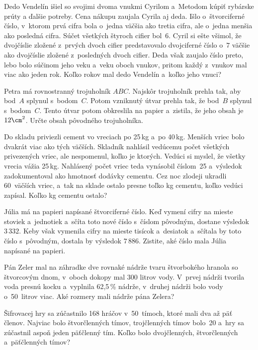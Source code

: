 {%
Dedo Vendelín išiel so svojimi dvoma vnukmi Cyrilom a~Metodom kúpiť rybárske prúty a ďalšie potreby. Cena nákupu zaujala Cyrila aj deda.
Išlo o~štvorciferné číslo, v~ktorom prvá cifra bola o~jedna väčšia ako tretia cifra, ale o~jedna menšia ako posledná cifra.
Súčet všetkých štyroch cifier bol~$6$.
Cyril si ešte všimol, že dvojčíslie zložené z~prvých dvoch cifier predstavovalo dvojciferné číslo o~$7$ väčšie ako dvojčíslie zložené z~posledných dvoch cifier.
Deda však zaujalo číslo preto, lebo bolo súčinom jeho veku a~veku oboch vnukov,
pritom každý z~vnukov mal viac ako jeden rok. Koľko rokov mal dedo Vendelín a~koľko jeho vnuci?
}

{%
Petra má rovnostranný trojuholník $ABC$. Najskôr trojuholník prehla tak, aby bod~$A$ splynul s~bodom~$C$.
Potom vzniknutý útvar prehla tak, že bod~$B$ splynul s~bodom~$C$.
Tento útvar potom obkreslila na papier a~zistila, že jeho obsah je $12\cm^2$. Určte obsah pôvodného trojuholníka.
}

{%
Do skladu priviezli cement vo vreciach po 25\,kg a~po 40\,kg. Menších vriec bolo dvakrát viac ako tých väčších.
Skladník nahlásil vedúcemu počet všetkých privezených vriec, ale nespomenul, koľko je ktorých.
Vedúci si myslel, že všetky vrecia vážia 25\,kg. Nahlásený počet vriec teda vynásobil číslom~25 a~výsledok zadokumentoval
ako hmotnosť dodávky cementu. Cez noc zlodeji ukradli 60~väčších vriec, a~tak na sklade ostalo presne
toľko kg cementu, koľko vedúci zapísal. Koľko kg cementu ostalo?
}

{%
Júlia má na papieri napísané štvorciferné číslo.
Keď vymení cifry na mieste stoviek a~jednotiek a~sčíta toto
nové číslo s~číslom pôvodným, dostane výsledok $3\,332$.
Keby však vymenila cifry na mieste tisícok a~desiatok a~sčítala by toto číslo
s~pôvodným, dostala by výsledok $7\,886$.
Zistite, aké číslo mala Júlia napísané na papieri.
}

{%
Pán Zeler mal na záhradke dve rovnaké nádrže tvaru štvorbokého hranola
so štvorcovým dnom, v~oboch dokopy mal 300 litrov vody.
V~prvej nádrži tvorila voda presnú kocku a~vyplnila 62{,}5\,\% nádrže, v~druhej
nádrži bolo vody o~50~litrov viac. Aké rozmery mali nádrže pána Zelera?
}

{%
Šifrovacej hry sa zúčastnilo 168 hráčov v~50~tímoch, ktoré mali dva až päť členov.
Najviac bolo štvorčlenných tímov, trojčlenných tímov bolo~20 a~hry sa zúčastnil
aspoň jeden päťčlenný tím. Koľko bolo dvojčlenných, štvorčlenných a~päťčlenných tímov?
}

